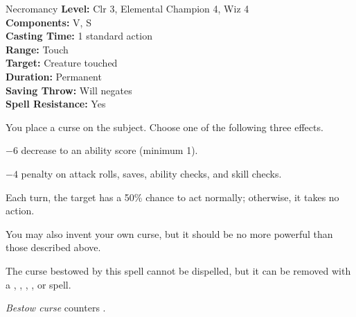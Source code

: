 {Necromancy}
{
	\textbf{Level:}
	Clr 3, Elemental Champion 4, Wiz 4\\
	\textbf{Components:}
	V, S\\
	\textbf{Casting Time:}
	1 standard action\\
	\textbf{Range:}
	Touch\\
	\textbf{Target:}
	Creature touched\\
	\textbf{Duration:}
	Permanent\\
	\textbf{Saving Throw:}
	Will negates\\
	\textbf{Spell Resistance:}
	Yes\\
}
{
	You place a curse on the subject. Choose one of the following three effects.
\begin{itemize*}
\item $-6$ decrease to an ability score (minimum 1).
\item $-4$ penalty on attack rolls, saves, ability checks, and skill checks.
\item Each turn, the target has a 50\% chance to act normally; otherwise, it takes no action.
\end{itemize*}

	You may also invent your own curse, but it should be no more powerful than those described above.

	The curse bestowed by this spell cannot be dispelled, but it can be removed with a , , , , or  spell.

	\emph{Bestow curse} counters .

}
